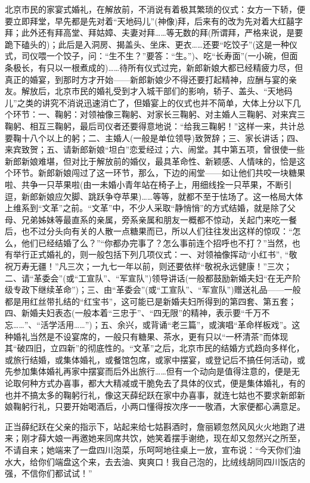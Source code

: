 \par 北京市民的家宴式婚礼，在解放前，不消说有着极其繁琐的仪式：女方一下轿，便要立即拜堂，早先都是先对着“天地码儿”(神像)拜，后来有的改为先对着大红囍字拜；此外还有拜高堂、拜姑嫜、夫妻对拜……等无数的拜(所谓拜，严格来说，是要跪下磕头的)；此后是入洞房、揭盖头、坐床、更衣……还要“吃饺子”(这是一种仪式，司仪喂一个饺子，问：“生不生？”要答：“生。”)、吃“长寿面”(一小碗，但面条极长，有只以一根煮成的)……待所有仪式过完，新郎新娘大都已经精疲力尽，但真正的婚宴，到那时方才开始——新郎新娘少不得还要打起精神，应酬与宴的亲友。解放后，北京市民的婚礼受到才入城干部们的影响，轿子、盖头、“天地码儿”之类的讲究不消说迅速消亡了，但婚宴上的仪式也并不简单，大体上分以下几个环节：一、鞠躬：对领袖像三鞠躬、对家长三鞠躬、对主婚人三鞠躬、对来宾三鞠躬、相互三鞠躬，最后司仪者还要得意地说：“给我三鞠躬！”这样一来，共计总要鞠十八个以上的躬；二、主婚人(一般是单位领导)致贺辞；三、家长讲话；四、来宾致贺；五、请新郎新娘“坦白”恋爱经过；六、闹堂。其中第五项，曾很使一些新郎新娘难堪，但对比于解放前的婚仪，最具革命性、新颖感、人情味的，恰是这个环节。新郎新娘闯过了这一环节，那么，下边的闹堂——如让他们共咬一块糖果啦、共争一只苹果啦(由一未婚小青年站在椅子上，用细线拴一只苹果，不断引逗，新郎新娘应欠脚、跳跃争夺苹果)……等等，就都不至于怯场了。这一格局大体上维系到“文革”之前。“文革”中，不少人采取“静悄悄”的方式结婚，就是除了父母、兄弟姊妹等最直系的亲属，旁系亲属和朋友一概都不惊动，关起门来吃一餐后，也不过分头向有关的人散一点糖果而已，所以人们往往发出这样的惊叹：“怎么，他们已经结婚了么？”“你都办完事了？怎么事前连个招呼也不打？”当然，也有举行正式婚礼的，则一般包括下列几项仪式：一、对领袖像挥动“小红书”, “敬祝万寿无疆！”凡三次；一九七一年以前，则还要依样“敬祝永远健康！”三次；二、请“革委会”(或“工宣队”、“军宣队”)领导讲话(一般都鼓励新婚夫妇“在无产阶级专政下继续革命”)；三、由“革委会”(或“工宣队”、“军宣队”)赠送礼品——一般都是用红丝带扎结的“红宝书”，这可能已是新婚夫妇所得到的第四套、第五套；四、新婚夫妇表态(一般本着“三忠于”、“四无限”的精神，表示要“千万不忘……”、“活学活用……”)；五、余兴，或背诵“老三篇”，或演唱“革命样板戏”。这种婚礼当然是不设宴席的，一般只有糖果、茶水，更有只以“一杯清茶”而体现其“破四旧，立四新”的彻底性的。“文革”之后，北京市民的结婚方式趋向多样化，或旅行结婚，或集体婚礼，或餐馆包席，或家中摆宴，或登记后不搞任何活动，或先参加集体婚礼再家中摆宴而后外出旅行……但有一个动向是值得注意的，便是无论取何种方式办喜事，都大大精减或干脆免去了具体的仪式，便是集体婚礼，有的也并不搞太多的鞠躬行礼，像这天薛纪跃在家中办喜事，就连七姑也不要求新郎新娘鞠躬行礼，只要开始喝酒后，小两口懂得按次序一一敬酒，大家便都心满意足。
\par 正当薛纪跃在父亲的指示下，站起来给七姑斟酒时，詹丽颖忽然风风火火地跑了进来；刚才薛大娘一再邀她来同席共饮，她笑着摆手谢绝，现在却又忽然兴之所至，不请自来；她端来了一盘四川泡菜，乐呵呵地往桌上一放，宣布说：“今天你们油水大，给你们端盘这个来，去去油、爽爽口！我自己泡的，比绒线胡同四川饭店的强，不信你们都试试！”

